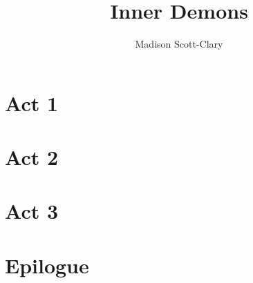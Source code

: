 \documentclass[12pt,letterpaper,oneside]{memoir}
\title{Inner Demons}
\author{Madison Scott-Clary}
\begin{document}
  \maketitle

  \newpage

  \tableofcontents

  \part{Act 1}
  

  \part{Act 2}
  
  

  \part{Act 3}
  
  
  
  

  \part{Epilogue}
  
\end{document}

